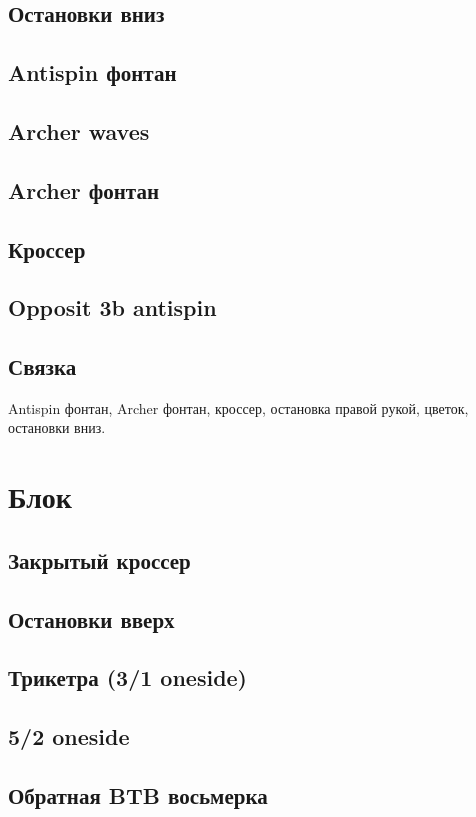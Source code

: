 \documentclass[a4paper, 12pt]{article}
\begin{document}
	\subsection{Остановки вниз}
	\subsection{Antispin фонтан}
	\subsection{Archer waves}
	\subsection{Archer фонтан}
	\subsection{Кроссер}
	\subsection{Opposit 3b antispin}
	\subsection{Связка}
	Antispin фонтан, Archer фонтан, кроссер, остановка правой рукой, цветок, остановки вниз.
	
	\section{Блок}
	
	\subsection{Закрытый кроссер}
	\subsection{Остановки вверх}
	\subsection{Трикетра (3/1 oneside)}
	\subsection{5/2 oneside}
	\subsection{Обратная BTB восьмерка}
\end{document}
